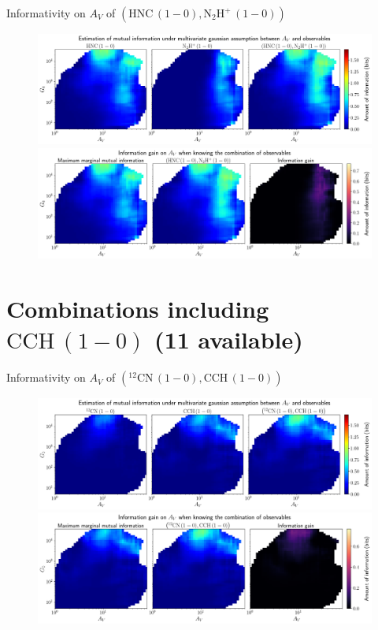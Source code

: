 \documentclass{beamer}
\begin{document}
\begin{frame}{Informativity on $A_V$ of $\left(\mathrm{HNC\,(1-0)},\mathrm{N_2H^+\,(1-0)}\right)$}
    \begin{figure}
        \centering
        \includegraphics[width=0.95\linewidth]{../linearinfogauss/av__hnc10_n2hp10_linearinfogauss.png}
        \vfill
        \includegraphics[width=0.95\linewidth]{../linearinfogauss/av__hnc10_n2hp10_linearinfogauss_gain.png}
    \end{figure}
\end{frame}

\section{Combinations including $\mathrm{CCH\,(1-0)}$ (11 available)}

\begin{frame}{Informativity on $A_V$ of $\left(\mathrm{^{12}CN\,(1-0)},\mathrm{CCH\,(1-0)}\right)$}
    \begin{figure}
        \centering
        \includegraphics[width=0.95\linewidth]{../linearinfogauss/av__12cn10_cch10_linearinfogauss.png}
        \vfill
        \includegraphics[width=0.95\linewidth]{../linearinfogauss/av__12cn10_cch10_linearinfogauss_gain.png}
    \end{figure}
\end{frame}
\end{document}
